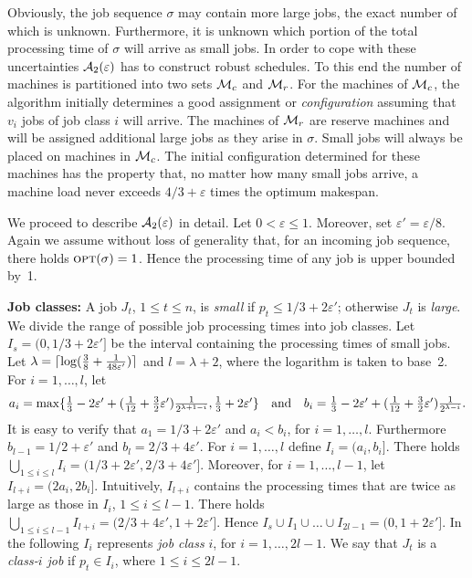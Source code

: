 \documentclass{llncs}
\newcommand{\OPT}{\text{{\sc opt}}}
\newcommand{\opt}{\OPT}
\newcommand{\eps}{\varepsilon}
\begin{document}
Obviously, the job sequence $\sigma$ may contain more large jobs, the exact number of which is unknown. 
Furthermore, it is unknown which portion of the total processing time of $\sigma$ will arrive as small 
jobs. In order to cope with these uncertainties ${\cal A}_2(\eps)$ has to construct robust schedules. 
To this end the number of machines is partitioned into two sets ${\cal M}_c$ and
${\cal M}_r$. For the machines of ${\cal M}_c$, the algorithm initially determines a good assignment or
{\em configuration\/} assuming that $v_i$ jobs of job class $i$ will arrive. The machines of ${\cal M}_r$
are reserve machines and will be assigned additional large jobs as they arise in $\sigma$. Small jobs
will always be placed on machines in ${\cal M}_c$. The initial configuration determined for these 
machines has the property that, no matter how many small jobs arrive, a machine load never exceeds $4/3+\eps$
times the optimum makespan.

We proceed to describe ${\cal A}_2(\eps)$ in detail. Let $0<\eps \leq 1$. Moreover, set $\eps' = \eps/8$.
Again we assume without loss of generality that, for an incoming job sequence, there holds $\opt(\sigma)=1$. 
Hence the processing time of any job is upper bounded by~1. 

{\bf Job classes:} A job $J_t$, $1\leq t \leq n$, is {\em small\/}
if $p_t \leq 1/3 + 2\eps'$; otherwise $J_t$ is {\em large\/}. We divide the range of possible job processing times
into job classes. Let $I_s = (0,1/3+2\eps']$ be the interval containing the processing times of small jobs.
Let $\lambda = \lceil \log({3\over 8} + {1\over 48\eps'})\rceil$ and $l = \lambda +2$, where the logarithm is
taken to base~2. For $i=1, \ldots, l$, let 
$$\textstyle a_i = \max\{{1\over 3} -2\eps' + ({1\over 12} + {3\over 2}\eps'){1\over 2^{\lambda+1-i}}, {1\over 3} + 2\eps'\}
\ \ \ \mbox{and} \ \ \ b_i = {1\over 3} -2\eps' + ({1\over 12} + {3\over 2}\eps'){1\over 2^{\lambda-i}}.$$
It is easy to verify that $a_1 = 1/3+2\eps'$ and $a_i < b_i$, for $i=1, \ldots, l$. Furthermore
$b_{l-1} = 1/2 +\eps'$ and $b_l = 2/3 + 4\eps'$. For $i=1, \ldots, l$ define
$I_i = (a_i,b_i]$. There holds $\bigcup_{1\leq i \leq l} I_i = (1/3+2\eps', 2/3+4\eps']$. Moreover, for 
$i=1, \ldots, l-1$, let $I_{l+i} = (2a_i,2b_i]$. Intuitively, $I_{l+i}$ contains the processing times that
are twice as large as those in $I_i$, $1\leq i \leq l-1$. There holds 
$\bigcup_{1\leq i \leq l-1} I_{l+i} = (2/3+4\eps', 1+2\eps']$. Hence $I_s \cup I_1 \cup \ldots \cup I_{2l-1} =
(0,1+2\eps']$. In the following $I_i$ represents {\em job class\/} $i$, for $i=1, \ldots, 2l-1$. We say that
$J_t$ is a {\em class-$i$ job\/} if $p_t\in I_i$, where $1\leq i \leq 2l-1$.
\end{document}
